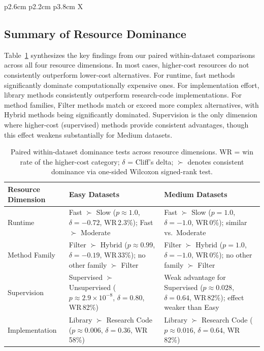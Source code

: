 \documentclass[preprint,12pt,authoryear]{elsarticle}
\begin{document}
{\begin{table}[h!]
\begin{tabularx}{\linewidth}{p{2.6cm} p{2.2cm} p{3.8cm} X}
\bottomrule
\end{tabularx}
\caption{Summary of the analyses reported in the Results section.}
\label{tab:results_tests_overview}



\end{table}

\subsection{Summary of Resource Dominance}\label{sec:summary_dominance}

Table~\ref{tab:wilcoxon_summary} synthesizes the key findings from our paired within-dataset comparisons across all four resource dimensions. In most cases, higher-cost resources do not consistently outperform lower-cost alternatives. For runtime, fast methods significantly dominate computationally expensive ones. For implementation effort, library methods consistently outperform research-code implementations. For method families, Filter methods match or exceed more complex alternatives, with Hybrid methods being significantly dominated. Supervision is the only dimension where higher-cost (supervised) methods provide consistent advantages, though this effect weakens substantially for Medium datasets.

\begin{table}[h]
\centering
\scriptsize
\setlength{\tabcolsep}{4pt}
\begin{tabularx}{\linewidth}{|l|X|X|}
\hline
\textbf{Resource Dimension} & \textbf{Easy Datasets} & \textbf{Medium Datasets} \\
\hline
Runtime & Fast $\succ$ Slow ($p{\approx}1.0$, $\delta{=}{-}0.72$, WR\,2.3\%); Fast $\succ$ Moderate & Fast $\succ$ Slow ($p{=}1.0$, $\delta{=}{-}1.0$, WR\,0\%); similar vs.\ Moderate \\
\hline
Method Family & Filter $\succ$ Hybrid ($p{\approx}0.99$, $\delta{=}{-}0.19$, WR\,33\%); no other family $\succ$ Filter & Filter $\succ$ Hybrid ($p{=}1.0$, $\delta{=}{-}1.0$, WR\,0\%); no other family $\succ$ Filter \\
\hline
Supervision & Supervised $\succ$ Unsupervised ($p{\approx}2.9{\times}10^{-8}$, $\delta{=}0.80$, WR\,82\%) & Weak advantage for Supervised ($p{\approx}0.028$, $\delta{=}0.64$, WR\,82\%); effect weaker than Easy \\
\hline
Implementation & Library $\succ$ Research Code ($p{\approx}0.006$, $\delta{=}0.36$, WR\,58\%) & Library $\succ$ Research Code ($p{\approx}0.016$, $\delta{=}0.64$, WR\,82\%) \\
\hline
\end{tabularx}
\caption{Paired within-dataset dominance tests across resource dimensions. WR = win rate of the higher-cost category; $\delta$ = Cliff's delta; $\succ$ denotes consistent dominance via one-sided Wilcoxon signed-rank test.}
\label{tab:wilcoxon_summary}
\end{table}

}
\end{document}
